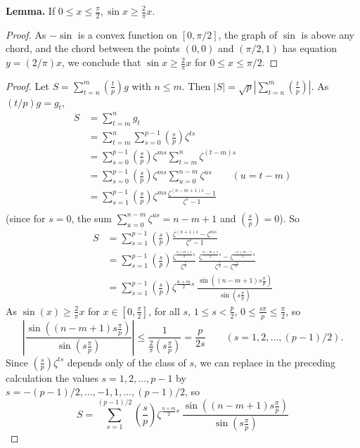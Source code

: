 \documentclass[11pt,a4paper]{article}
\newcommand{\legendre}[2]{\genfrac{(}{)}{}{}{#1}{#2}}
\begin{document}
{\bf Lemma.} If $0\leq x \leq \frac{\pi}{2}, \sin x \geq \frac{2}{\pi} x$.
\begin{proof}
As $-\sin$ is a convex function on $[0,\pi/2]$, the graph of $\sin$ is above any chord, and the chord between the points $(0,0)$ and $(\pi/2,1)$ has equation $y = (2/\pi) x$, we conclude that
 $\sin x \geq \frac{2}{\pi} x$ for $0\leq x \leq \pi/2$. 
\end{proof}
\begin{proof}
Let $S = \sum\limits_{t = n}^m \legendre{t}{p} g$ with $n\leq m$. Then $\vert S \vert = \sqrt{p} \left|\sum\limits_{t = n}^m \legendre{t}{p}\right|$. As $(t/p)g = g_t$,
\begin{align*}
S&= \sum _{t=m}^n g_t\\
&=\sum _{t=m}^n \sum_{s=0}^{p-1}\legendre{s}{p} \zeta^{ts}\\
&=\sum_{s=0}^{p-1} \legendre{s}{p} \zeta^{ms} \sum _{t=m}^n \zeta^{(t-m)s}\\
&=\sum_{s=0}^{p-1} \legendre{s}{p} \zeta^{ms} \sum _{u=0}^{n-m} \zeta^{us} \qquad( u=t-m)\\
&=\sum_{s=1}^{p-1} \legendre{s}{p} \zeta^{ms} \frac{\zeta^{(n-m+1)s}-1}{\zeta^s-1}\\
\end{align*}
(since for $s=0$, the sum $\sum _{u=0}^{n-m} \zeta^{us} = n-m+1$ and $\legendre{s}{p} = 0$). So
\begin{align*}
S &= \sum_{s=1}^{p-1} \legendre{s}{p} \frac{\zeta^{(n+1)s}-\zeta^{ms}}{\zeta^s-1}\\
&=\sum_{s=1}^{p-1} \legendre{s}{p} \frac{\zeta^{\frac{n+m+1}{2} s}}{\zeta^{\frac{s}{2}}} \  \frac{\zeta^{\frac{n-m+1}{2} s}-\zeta^{\frac{-n+m-1}{2} s}}{\zeta^{\frac{s}{2}}-\zeta^{\frac{-s}{2}}}\\
&= \sum_{s=1}^{p-1} \legendre{s}{p}\zeta^{\frac{n+m}{2} s} \ \frac{\sin \left((n-m+1)s \frac{\pi}{p}\right)} { \sin \left(s \frac{\pi}{p}\right) }
\end{align*}
As $\sin(x) \geq \frac{2}{\pi} x$ for $x \in [0,\frac{\pi}{2}]$, for all $s$, $1\leq s <\frac{p}{2}$, $0 \leq \frac{s \pi}{p} \leq \frac{\pi}{2} $, so
$$\left| \frac{\sin \left((n-m+1)s \frac{\pi}{p}\right)} { \sin \left(s \frac{\pi}{p}\right)} \right |  \leq \frac{1}{\frac{2}{\pi} \left(s\frac{\pi}{p} \right)} = \frac{p}{2s}\qquad (s = 1,2,\ldots,(p-1)/2).$$
Since $\legendre{s}{p} \zeta^{ts}$ depends only of the class of $s$, we can replace in the preceding calculation the values $s = 1,2,\ldots,p-1$ by $s=-(p-1)/2,\ldots, -1,1,\ldots,(p-1)/2$, so
$$S = \sum_{s=1}^{(p-1)/2}\legendre{s}{p}\zeta^{\frac{n+m}{2} s} \ \frac{\sin \left((n-m+1)s \frac{\pi}{p}\right)} { \sin \left(s \frac{\pi}{p}\right) }
$$
\end{proof}
\end{document}
